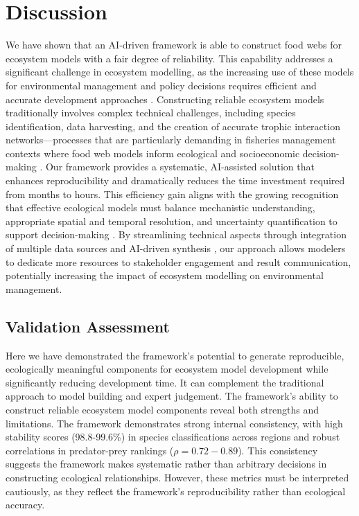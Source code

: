 \section{Discussion}

We have shown that an AI-driven framework is able to construct food webs for ecosystem models with a fair degree of reliability. This capability addresses a significant challenge in ecosystem modelling, as the increasing use of these models for environmental management and policy decisions requires efficient and accurate development approaches \citep{weiskopf2022increasing, schuwirth2019make}. Constructing reliable ecosystem models traditionally involves complex technical challenges, including species identification, data harvesting, and the creation of accurate trophic interaction networks—processes that are particularly demanding in fisheries management contexts where food web models inform ecological and socioeconomic decision-making \citep{chakravorty2024systematic}. Our framework provides a systematic, AI-assisted solution that enhances reproducibility and dramatically reduces the time investment required from months to hours. This efficiency gain aligns with the growing recognition that effective ecological models must balance mechanistic understanding, appropriate spatial and temporal resolution, and uncertainty quantification to support decision-making \citep{schuwirth2019make}. By streamlining technical aspects through integration of multiple data sources \citep{Christensen2004, Colleter2015} and AI-driven synthesis \citep{spillias2024human, Noleto2024}, our approach allows modelers to dedicate more resources to stakeholder engagement and result communication, potentially increasing the impact of ecosystem modelling on environmental management.

\subsection{Validation Assessment}

Here we have demonstrated the framework's potential to generate reproducible, ecologically meaningful components for ecosystem model development while significantly reducing development time. It can complement the traditional approach to model building and expert judgement. The framework's ability to construct reliable ecosystem model components reveal both strengths and limitations. The framework demonstrates strong internal consistency, with high stability scores (98.8-99.6\%) in species classifications across regions and robust correlations in predator-prey rankings ($\rho = 0.72-0.89$). This consistency suggests the framework makes systematic rather than arbitrary decisions in constructing ecological relationships. However, these metrics must be interpreted cautiously, as they reflect the framework's reproducibility rather than ecological accuracy.

